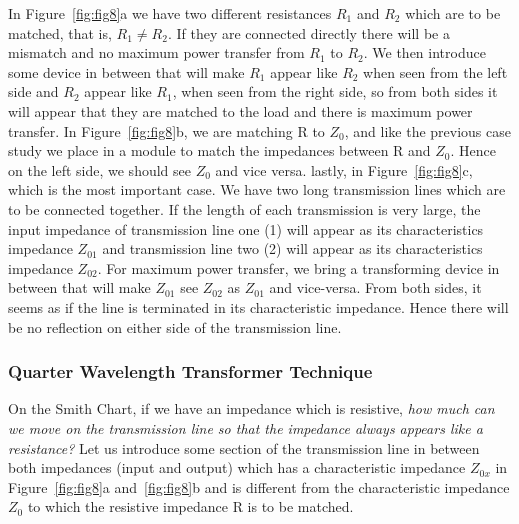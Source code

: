 In Figure~{\ref{fig:fig8}a} we have two different resistances $R_1$ and $R_2$ which are to be matched, that is, $R_1\neq R_2$. If they are connected directly there will be a mismatch and no maximum power transfer from $R_1$ to $R_2$. We then introduce some device in between that will make $R_1$ appear like $R_2$ when seen from the left side and $R_2$ appear like $R_1$, when seen from the right side, so from both sides it will appear that they are matched to the load and there is maximum power transfer. In Figure~\ref{fig:fig8}b, we are matching R to $Z_0$, and like the previous case study we place in a module to match the impedances between R and $Z_0$. Hence on the left side, we should see $Z_0$ and vice versa. lastly, in Figure~{\ref{fig:fig8}c}, which is the most important case. We have two long transmission lines which are to be connected together. If the length of each transmission is very large, the input impedance of transmission line one (1) will appear as its characteristics impedance $ Z_{01}$ and transmission line two (2) will appear as its characteristics impedance $ Z_{02}$. For maximum power transfer, we bring a transforming device in between that will make $Z_{01}$ see $Z_{02}$ as $Z_{01}$ and vice-versa. From both sides, it seems as if the line is terminated in its characteristic impedance. Hence there will be no reflection on either side of the transmission line.

\subsubsection{Quarter Wavelength Transformer Technique}
On the Smith Chart, if we have an impedance which is resistive, \emph{how much can we move on the transmission line so that the impedance always appears like a resistance?} Let us introduce some section of the transmission line in between both impedances (input and output) which has a characteristic impedance $ Z_{0x}$ in Figure~{\ref{fig:fig8}a} and~\ref{fig:fig8}b and is different from the characteristic impedance $ Z_0$ to which the resistive impedance R is to be matched.

